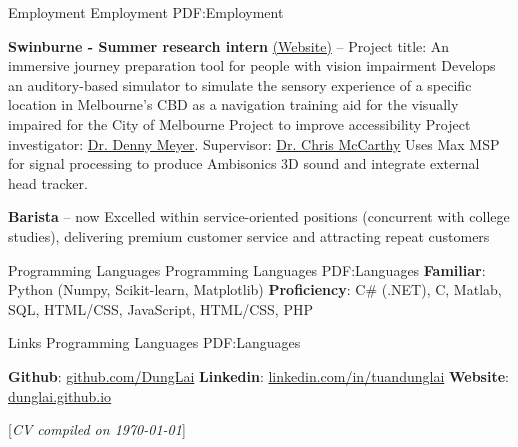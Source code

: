\documentclass[letterpaper,MMMyyyy,nonstopmode]{simpleresumecv}
\newcommand{\CVNote}{CV compiled on {\today}}
\begin{document}
\begin{Body}
\Section 
{Employment}
{Employment}
{PDF:Employment}

\BulletItem
\textbf{Swinburne - Summer research intern} \href{https://dunglai.github.io/COM/index.html}{(\color{blue}Website)}
\hfill
{} --
\SubBulletItem Project title: An immersive journey preparation tool for people with vision impairment
\SubBulletItem Develops an auditory-based simulator to simulate the sensory experience of a specific location in Melbourne's CBD as a navigation training aid for the visually impaired for the City of Melbourne Project to improve accessibility
\SubBulletItem Project investigator: \href{http://www.swinburne.edu.au/health-arts-design/staff/profile/index.php?id=dmeyer}{\color{blue}Dr. Denny Meyer}. Supervisor: \href{https://www.swinburne.edu.au/science-engineering-technology/staff/profile/index.php?id=cdmccarthy}{\color{blue}Dr. Chris McCarthy}
\SubBulletItem Uses Max MSP for signal processing to produce Ambisonics 3D sound and integrate external head tracker.

\BulletItem
\textbf{Barista}
\hfill
{} --
now
\SubBulletItem Excelled within service-oriented positions (concurrent with college studies), delivering premium customer service and attracting repeat customers

\Section 
{Programming Languages}
{Programming Languages}
{PDF:Languages}
\BulletItem \textbf{Familiar}: Python (Numpy, Scikit-learn, Matplotlib)
\BulletItem \textbf{Proficiency}: C\# (.NET), C, Matlab, SQL, HTML/CSS, JavaScript, HTML/CSS, PHP

\Section 
{Links}
{Programming Languages}
{PDF:Languages}

\BulletItem \textbf{Github}: \href{https://github.com/DungLai}{\color{blue}github.com/DungLai}
\BulletItem \textbf{Linkedin}: \href{https://www.linkedin.com/in/tuandunglai/}{\color{blue}linkedin.com/in/tuandunglai}
\BulletItem \textbf{Website}: \href{https://dunglai.github.io/}{\color{blue}dunglai.github.io}
\end{Body}



\BigGap
\UseNoteFont%
\null\hfill%
[\textit{\CVNote}]
\end{document}
